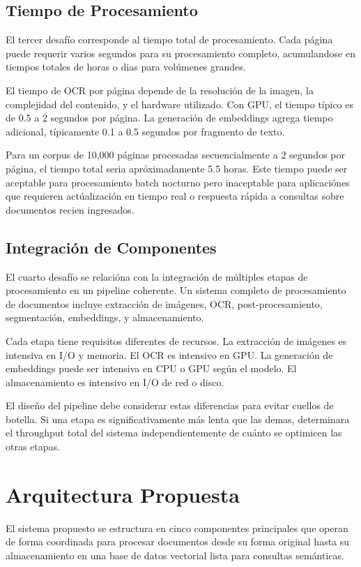 \documentclass[12pt,a4paper,twoside]{book}
\begin{document}
\subsection{Tiempo de Procesamiento}

El tercer desafío corresponde al tiempo total de procesamiento. Cada página puede requerir varios segundos para su procesamiento completo, acumulandose en tiempos totales de horas o dias para volúmenes grandes.

El tiempo de OCR por página depende de la resolución de la imagen, la complejidad del contenido, y el hardware utilizado. Con GPU, el tiempo típico es de 0.5 a 2 segundos por página. La generación de embeddings agrega tiempo adicional, típicamente 0.1 a 0.5 segundos por fragmento de texto.

Para un corpus de 10,000 páginas procesadas secuencialmente a 2 segundos por página, el tiempo total seria apróximadamente 5.5 horas. Este tiempo puede ser aceptable para procesamiento batch nocturno pero inaceptable para aplicaciónes que requieren actúalización en tiempo real o respuesta rápida a consultas sobre documentos recien ingresados.

\subsection{Integración de Componentes}

El cuarto desafío se relacióna con la integración de múltiples etapas de procesamiento en un pipeline coherente. Un sistema completo de procesamiento de documentos incluye extracción de imágenes, OCR, post-procesamiento, segmentación, embeddings, y almacenamiento.

Cada etapa tiene requisitos diferentes de recursos. La extracción de imágenes es intensiva en I/O y memoria. El OCR es intensivo en GPU. La generación de embeddings puede ser intensiva en CPU o GPU según el modelo. El almacenamiento es intensivo en I/O de red o disco.

El diseño del pipeline debe considerar estas diferencias para evitar cuellos de botella. Si una etapa es significativamente más lenta que las demas, determinara el throughput total del sistema independientemente de cuánto se optimicen las otras etapas.

\section{Arquitectura Propuesta}

El sistema propuesto se estructura en cinco componentes principales que operan de forma coordinada para procesar documentos desde su forma original hasta su almacenamiento en una base de datos vectorial lista para consultas semánticas.
\end{document}

